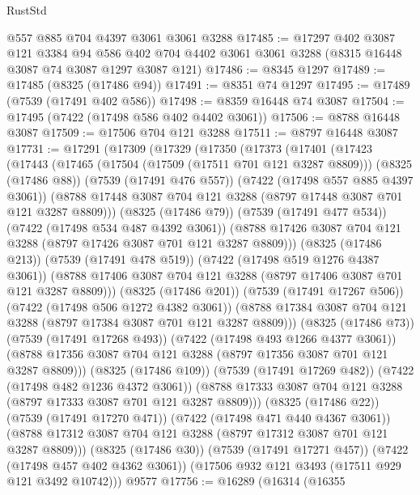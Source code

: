 \begin{lexlean}{RustStd}
\begin{coremodule}
    @557
    @885
    @704
    @4397
    @3061
    @3061
    @3288
@17485 := @17297
    @402
    @3087
    @121
    @3384
    @94
    @586
    @402
    @704
    @4402
    @3061
    @3061
    @3288
    (@8315 @16448 @3087 @74 @3087 @1297 @3087 @121)
@17486 := @8345 @1297
@17489 := @17485 (@8325 (@17486 @94))
@17491 := @8351 @74 @1297
@17495 := @17489 (@7539 (@17491 @402 @586))
@17498 := @8359 @16448 @74 @3087
@17504 := @17495 (@7422 (@17498 @586 @402 @4402 @3061))
@17506 := @8788 @16448 @3087
@17509 := @17506 @704 @121 @3288
@17511 := @8797 @16448 @3087
@17731 := @17291
    (@17309
      (@17329
        (@17350
          (@17373
            (@17401
              (@17423
                (@17443
                  (@17465
                    (@17504 (@17509 (@17511 @701 @121 @3287 @8809)))
                    (@8325 (@17486 @88))
                    (@7539 (@17491 @476 @557))
                    (@7422 (@17498 @557 @885 @4397 @3061))
                    (@8788 @17448 @3087 @704 @121 @3288 (@8797 @17448 @3087 @701 @121 @3287 @8809)))
                  (@8325 (@17486 @79))
                  (@7539 (@17491 @477 @534))
                  (@7422 (@17498 @534 @487 @4392 @3061))
                  (@8788 @17426 @3087 @704 @121 @3288 (@8797 @17426 @3087 @701 @121 @3287 @8809)))
                (@8325 (@17486 @213))
                (@7539 (@17491 @478 @519))
                (@7422 (@17498 @519 @1276 @4387 @3061))
                (@8788 @17406 @3087 @704 @121 @3288 (@8797 @17406 @3087 @701 @121 @3287 @8809)))
              (@8325 (@17486 @201))
              (@7539 (@17491 @17267 @506))
              (@7422 (@17498 @506 @1272 @4382 @3061))
              (@8788 @17384 @3087 @704 @121 @3288 (@8797 @17384 @3087 @701 @121 @3287 @8809)))
            (@8325 (@17486 @73))
            (@7539 (@17491 @17268 @493))
            (@7422 (@17498 @493 @1266 @4377 @3061))
            (@8788 @17356 @3087 @704 @121 @3288 (@8797 @17356 @3087 @701 @121 @3287 @8809)))
          (@8325 (@17486 @109))
          (@7539 (@17491 @17269 @482))
          (@7422 (@17498 @482 @1236 @4372 @3061))
          (@8788 @17333 @3087 @704 @121 @3288 (@8797 @17333 @3087 @701 @121 @3287 @8809)))
        (@8325 (@17486 @22))
        (@7539 (@17491 @17270 @471))
        (@7422 (@17498 @471 @440 @4367 @3061))
        (@8788 @17312 @3087 @704 @121 @3288 (@8797 @17312 @3087 @701 @121 @3287 @8809)))
      (@8325 (@17486 @30))
      (@7539 (@17491 @17271 @457))
      (@7422 (@17498 @457 @402 @4362 @3061))
      (@17506 @932 @121 @3493 (@17511 @929 @121 @3492 @10742)))
    @9577
@17756 := @16289
    (@16314
      (@16355

\end{coremodule}
\end{lexlean}
